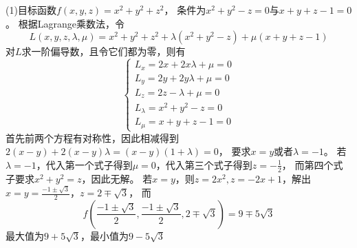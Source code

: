 \begin{solution}
  (1)目标函数$f(x,y,z) = x^2 + y^2 + z^2$，
  条件为$x^2+y^2 - z = 0$与$x+y+z-1=0$。
  根据Lagrange乘数法，令
  \begin{equation*}
    L(x,y,z,\lambda,\mu) = x^2 + y^2 + z^2 + \lambda(x^2 + y^2 - z) + \mu(x+y+z-1)
  \end{equation*}
  对$L$求一阶偏导数，且令它们都为零，则有
  \begin{equation*}
    \begin{cases}
      L_x = 2x + 2x \lambda + \mu = 0\\
      L_y = 2y + 2y\lambda + \mu = 0\\
      L_z = 2z - \lambda + \mu = 0\\
      L_{\lambda} = x^2 + y^2 - z = 0\\
      L_{\mu} = x + y + z - 1 = 0
    \end{cases}
  \end{equation*}
  首先前两个方程有对称性，因此相减得到$2(x-y)+2(x-y)\lambda = (x-y)(1 + \lambda) = 0$，
  要求$x = y$或者$\lambda = -1$。
  若$\lambda = -1$，代入第一个式子得到$\mu = 0$，代入第三个式子得到$z = - \frac{1}{2}$，
  而第四个式子要求$x^2 + y^2 = z$，因此无解。
  若$x = y$，则$z = 2x^2, z = -2x + 1$，解出$x = y = \frac{-1 \pm \sqrt{3}}{2}$，$z = 2 \mp \sqrt{3}$，
  而
  \begin{equation*}
    f \left( \frac{-1 \pm \sqrt{3}}{2}, \frac{-1 \pm \sqrt{3}}{2}, 2 \mp \sqrt{3} \right) = 9 \mp 5 \sqrt{3}
  \end{equation*}
  最大值为$9 + 5 \sqrt{3}$，最小值为$9 - 5 \sqrt{3}$
\end{solution}












